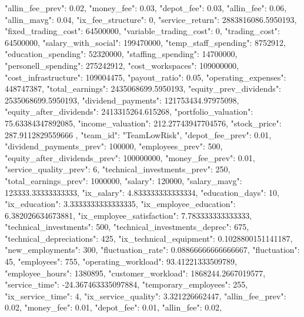 {{            "allin_fee_prev": 0.02,
            "money_fee": 0.03,
            "depot_fee": 0.03,
            "allin_fee": 0.06,
            "allin_mavg": 0.04,
            "ix_fee_structure": 0,
            "service_return": 2883816086.5950193,
            "fixed_trading_cost": 64500000,
            "variable_trading_cost": 0,
            "trading_cost": 64500000,
            "salary_with_social": 199470000,
            "temp_staff_spending": 8752912,
            "education_spending": 52320000,
            "staffing_spending": 14700000,
            "personell_spending": 275242912,
            "cost_workspaces": 109000000,
            "cost_infrastructure": 109004475,
            "payout_ratio": 0.05,
            "operating_expenses": 448747387,
            "total_earnings": 2435068699.5950193,
            "equity_prev_dividends": 2535068699.5950193,
            "dividend_payments": 121753434.97975098,
            "equity_after_dividends": 2413315264.615268,
            "portfolio_valuation": 75.63384347892085,
            "income_valuation": 212.27743947704576,
            "stock_price": 287.9112829559666
        },
        {
            "team_id": "TeamLowRisk",
            "depot_fee_prev": 0.01,
            "dividend_payments_prev": 100000,
            "employees_prev": 500,
            "equity_after_dividends_prev": 100000000,
            "money_fee_prev": 0.01,
            "service_quality_prev": 6,
            "technical_investments_prev": 250,
            "total_earnings_prev": 1000000,
            "salary": 120000,
            "salary_mavg": 123333.33333333333,
            "ix_salary": 4.833333333333334,
            "education_days": 10,
            "ix_education": 3.3333333333333335,
            "ix_employee_education": 6.382026634673881,
            "ix_employee_satisfaction": 7.783333333333333,
            "technical_investments": 500,
            "technical_investments_deprec": 675,
            "technical_depreciations": 425,
            "ix_technical_equipment": 0.1028800151141187,
            "new_employments": 300,
            "fluctuation_rate": 0.08866666666666667,
            "fluctuation": 45,
            "employees": 755,
            "operating_workload": 93.41221333509789,
            "employee_hours": 1380895,
            "customer_workload": 1868244.2667019577,
            "service_time": -24.367463335097884,
            "temporary_employees": 255,
            "ix_service_time": 4,
            "ix_service_quality": 3.321226662447,
            "allin_fee_prev": 0.02,
            "money_fee": 0.01,
            "depot_fee": 0.01,
            "allin_fee": 0.02,
}}
